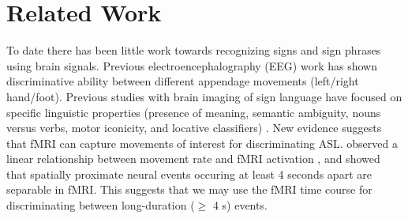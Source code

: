 \documentclass{proposal}
\begin{document}
\section{Related Work}

To date there has been little work towards recognizing signs and sign phrases using brain signals. Previous electroencephalography (EEG) work has shown discriminative ability between different appendage movements (left/right hand/foot). Previous studies with brain imaging of sign language have focused on specific linguistic properties (presence of meaning, semantic ambiguity, nouns versus verbs, motor iconicity, and locative classifiers) \cite{supp2005_smr, tranel2005_env, lee2006_mme, dehaene1995_eec, hjorth1975_oie, perrin1988_sss, corina2003_llb, emmorey2004_mis, emmorey_broca_region_2006}. New evidence suggests that fMRI can capture movements of interest for discriminating ASL. \cite{rao1996rbf} observed a linear relationship between movement rate and fMRI activation , and \cite{kim1997ltr} showed that spatially proximate neural events occuring at least 4 seconds apart are separable in fMRI. This suggests that we may use the fMRI time course for discriminating between long-duration ($\geq$ 4 s) events.

\end{document}

